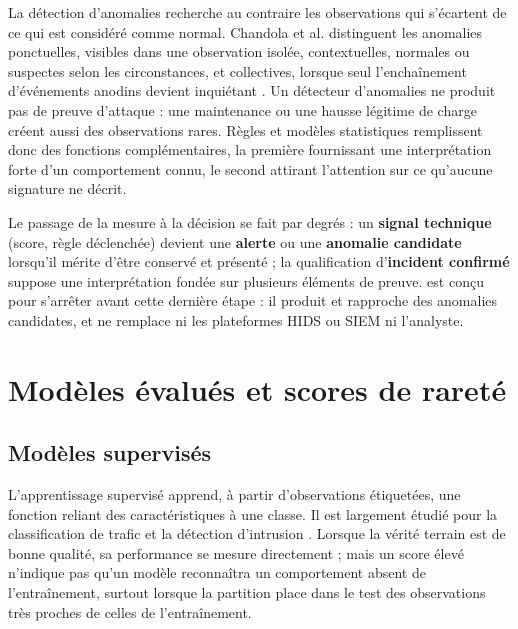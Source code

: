 La détection d'anomalies recherche au contraire les observations qui s'écartent de ce qui est considéré comme normal. Chandola et al. distinguent les anomalies ponctuelles, visibles dans une observation isolée, contextuelles, normales ou suspectes selon les circonstances, et collectives, lorsque seul l'enchaînement d'événements anodins devient inquiétant \cite{chandola2009anomaly}. Un détecteur d'anomalies ne produit pas de preuve d'attaque : une maintenance ou une hausse légitime de charge créent aussi des observations rares. Règles et modèles statistiques remplissent donc des fonctions complémentaires, la première fournissant une interprétation forte d'un comportement connu, le second attirant l'attention sur ce qu'aucune signature ne décrit.

Le passage de la mesure à la décision se fait par degrés : un \textbf{signal technique} (score, règle déclenchée) devient une \textbf{alerte} ou une \textbf{anomalie candidate} lorsqu'il mérite d'être conservé et présenté ; la qualification d'\textbf{incident confirmé} suppose une interprétation fondée sur plusieurs éléments de preuve. \logminer{} est conçu pour s'arrêter avant cette dernière étape : il produit et rapproche des anomalies candidates, et ne remplace ni les plateformes HIDS ou SIEM ni l'analyste.

\section{Modèles évalués et scores de rareté}

\subsection{Modèles supervisés}

L'apprentissage supervisé apprend, à partir d'observations étiquetées, une fonction reliant des caractéristiques à une classe. Il est largement étudié pour la classification de trafic et la détection d'intrusion \cite{buczak2016survey,khraisat2019survey}. Lorsque la vérité terrain est de bonne qualité, sa performance se mesure directement ; mais un score élevé n'indique pas qu'un modèle reconnaîtra un comportement absent de l'entraînement, surtout lorsque la partition place dans le test des observations très proches de celles de l'entraînement.

